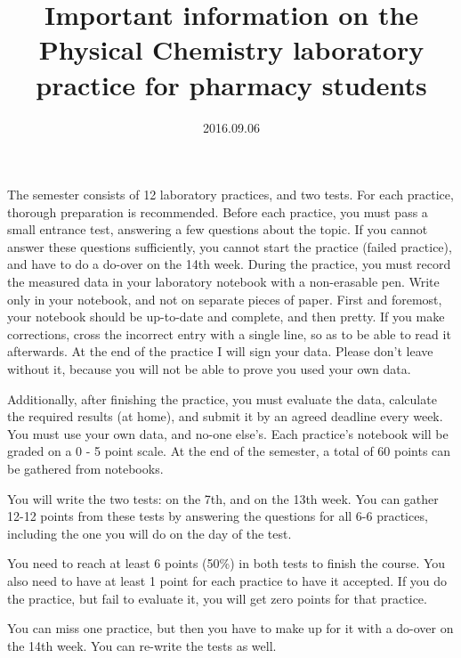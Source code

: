 \documentclass{article}
\begin{document}
\title{Important information on the Physical Chemistry laboratory practice for pharmacy students}
\date{2016.09.06}
\maketitle

The semester consists of 12 laboratory practices, and two tests. For each practice, thorough preparation is recommended. Before each practice, you must pass a small entrance test, answering a few questions about the topic. If you cannot answer these questions sufficiently, you cannot start the practice (failed practice), and have to do a do-over on the 14th week. During the practice, you must record the measured data in your laboratory notebook with a non-erasable pen. Write only in your notebook, and not on separate pieces of paper. First and foremost, your notebook should be up-to-date and complete, and then pretty. If you make corrections, cross the incorrect entry with a single line, so as to be able to read it afterwards. At the end of the practice I will sign your data. Please don't leave without it, because you will not be able to prove you used your own data.

Additionally, after finishing the practice, you must evaluate the data, calculate the required results (at home), and submit it by an agreed deadline every week. You must use your own data, and no-one else's. Each practice's notebook will be graded on a 0 - 5 point scale. At the end of the semester, a total of 60 points can be gathered from notebooks. 

You will write the two tests: on the 7th, and on the 13th week. You can gather 12-12 points from these tests by answering the questions for all 6-6 practices, including the one you will do on the day of the test.

You need to reach at least 6 points (50\%) in both tests to finish the course. You also need to have at least 1 point for each practice to have it accepted. If you do the practice, but fail to evaluate it, you will get zero points for that practice.

You can miss one practice, but then you have to make up for it with a do-over on the 14th week. You can re-write the tests as well.
\end{document}
